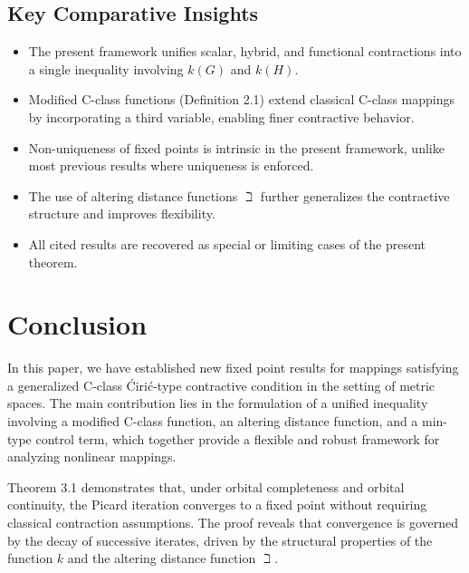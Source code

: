 \documentclass[11pt,reqno]{amsart}
\theoremstyle{definition}
\theoremstyle{remark}
\numberwithin{equation}{section}
\begin{document}
\subsection*{Key Comparative Insights}

\begin{itemize}
	\item The present framework unifies scalar, hybrid, and functional contractions into a single inequality involving $k(G)$ and $k(H)$.
	
	\item Modified C-class functions (Definition 2.1) extend classical C-class mappings by incorporating a third variable, enabling finer contractive behavior.
	
	\item Non-uniqueness of fixed points is intrinsic in the present framework, unlike most previous results where uniqueness is enforced.
	
	\item The use of altering distance functions $\beth$ further generalizes the contractive structure and improves flexibility.
	
	\item All cited results are recovered as special or limiting cases of the present theorem.
\end{itemize}
	
	\section{Conclusion}
	
	In this paper, we have established new fixed point results for mappings satisfying a generalized C-class Ćirić-type contractive condition in the setting of metric spaces. The main contribution lies in the formulation of a unified inequality involving a modified C-class function, an altering distance function, and a min-type control term, which together provide a flexible and robust framework for analyzing nonlinear mappings.
	
	Theorem 3.1 demonstrates that, under orbital completeness and orbital continuity, the Picard iteration converges to a fixed point without requiring classical contraction assumptions. The proof reveals that convergence is governed by the decay of successive iterates, driven by the structural properties of the function $k$ and the altering distance function $\beth$.
	
\end{document}
